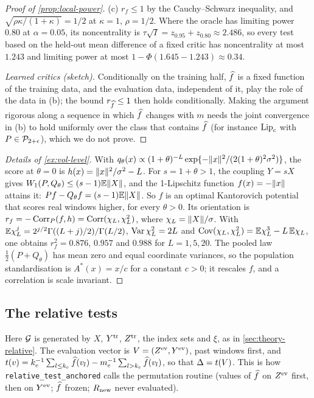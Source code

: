 \begin{proof}[Proof of \cref{prop:local-power}]
(c) $r_f\le1$ by the Cauchy--Schwarz inequality, and $\sqrt{\rho\kappa/(1+\kappa)}=1/2$ at
$\kappa=1$, $\rho=1/2$. Where the oracle has limiting power $0.80$ at $\alpha=0.05$, its
noncentrality is $\tau\sqrt I=z_{0.95}+z_{0.80}\approx2.486$, so every test based on the held-out
mean difference of a fixed critic has noncentrality at most $1.243$ and limiting power at most $1-\Phi(1.645-1.243)\approx0.34$.

\emph{Learned critics (sketch).} Conditionally on the training half, $\widehat{f}$ is a fixed function
of the training data, and the evaluation data, independent of it, play the role of the data in
(b); the bound $r_{\widehat{f}}\le1$ then holds conditionally. Making the argument rigorous along a
sequence in which $\widehat{f}$ changes with $m$ needs the joint convergence in (b) to hold uniformly
over the class that contains $\widehat{f}$ (for instance $\operatorname{Lip}_c$ with $P\in\mathcal{P}_{2+\epsilon}$),
which we do not prove.
\end{proof}

\begin{proof}[Details of \cref{ex:vol-level}]
With $q_\theta(x)\propto(1+\theta)^{-L}\exp\{-\lVert x\rVert^2/(2(1+\theta)^2\sigma^2)\}$, the score at
$\theta=0$ is $h(x)=\lVert x\rVert^2/\sigma^2-L$. For $s=1+\theta>1$, the coupling $Y=sX$ gives
$W_{1}(P,Q_\theta)\le(s-1)\mathbb{E}\lVert X\rVert$, and the 1-Lipschitz function $f(x)=-\lVert x\rVert$ attains it:
$Pf-Q_\theta f=(s-1)\mathbb{E}\lVert X\rVert$. So $f$ is an optimal Kantorovich potential that scores real
windows higher, for every $\theta>0$. Its orientation is
$r_f=-\operatorname{Corr}_P(f,h)=\operatorname{Corr}(\chi_L,\chi_L^2)$, where $\chi_L=\lVert X\rVert/\sigma$. With
$\mathbb{E}\chi_L^j=2^{j/2}\Gamma((L+j)/2)/\Gamma(L/2)$, $\operatorname{Var}\chi_L^2=2L$ and
$\operatorname{Cov}(\chi_L,\chi_L^2)=\mathbb{E}\chi_L^3-L\,\mathbb{E}\chi_L$, one obtains $r_f^2=0.876$, $0.957$ and $0.988$ for
$L=1,5,20$. The pooled law $\tfrac12(P+Q_\theta)$ has mean zero and equal coordinate variances, so
the population standardisation is $A^*(x)=x/c$ for a constant $c>0$; it rescales $f$, and a
correlation is scale invariant.
\end{proof}

\subsection{The relative tests}\label{app:proofs-relative}

Here $\mathcal{G}$ is generated by $X$, $Y^{\mathrm{tr}}$, $Z^{\mathrm{tr}}$, the index sets and $\xi$, as in
\cref{sec:theory-relative}. The evaluation vector is $V=(Z^{\mathrm{ev}},Y^{\mathrm{ev}})$, past windows first,
and $t(v)=k_e^{-1}\sum_{l\le k_e}\widehat{f}(v_l)-m_e^{-1}\sum_{l>k_e}\widehat{f}(v_l)$, so that $\Delta=t(V)$.
This is how \texttt{relative\_test\_anchored} calls the permutation routine (values of $\widehat{f}$ on
$Z^{\mathrm{ev}}$ first, then on $Y^{\mathrm{ev}}$; $\widehat{f}$ frozen; $R_{\mathrm{new}}$ never evaluated).

